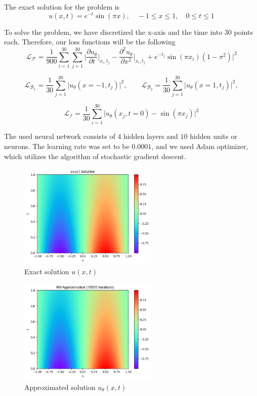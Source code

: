 \documentclass[a4paper,12pt]{article}
\theoremstyle{definition}
\begin{document}
The exact solution for the problem is 
\begin{equation}
u(x, t) = e^{-t} \sin(\pi x), \quad -1 \le x \le 1, \quad 0 \le t \le 1
\end{equation}

To solve the problem, we have discretized the x-axis and the time into $30$ points each.
Therefore, our loss functions will be the following
$$
\mathcal{L}_{\mathcal{F}} = \frac{1}{900} \sum_{i=1}^{30} \sum_{j=1}^{30} 
\Bigg| 
\frac{\partial u_\theta}{\partial t}\bigg|_{x_i, t_j} - \frac{\partial^2 u_\theta}{\partial x^2}\bigg|_{x_i, t_j}
+ e^{-t_j} \sin{(\pi x_i)} (1 - \pi^2) 
\Bigg|^2
$$

$$
\mathcal{L}_{\mathcal{B}_1} = \frac{1}{30} \sum_{j=1}^{30} 
\Bigg| u_\theta(x=-1, t_j) \Bigg|^2, \qquad
\mathcal{L}_{\mathcal{B}_2} = \frac{1}{30} \sum_{j=1}^{30} 
\Bigg| u_\theta(x=1, t_j) \Bigg|^2,
$$

$$
\mathcal{L}_{\mathcal{I}} = \frac{1}{30} \sum_{i=1}^{30}
\Bigg| u_\theta(x_j, t=0) - \sin(\pi x_j) \Bigg|^2
$$

The used neural network consists of $4$ hidden layers and $10$ hidden units or neurons.
The learning rate was set to be $0.0001$, and we used Adam optimizer, which utilizes the 
algorithm of stochastic gradient descent. 

\begin{figure}[H]
    \centering
    \includegraphics[width=250px]{images/exact_solution_diff.png}
    \vspace{-1em}
    \caption{Exact solution $u(x,t)$}
    \label{exact diff}
\end{figure}

\begin{figure}[H]
    \centering
    \includegraphics[width=250px]{images/approx_solution_diff.png}
    \vspace{-1em}
    \caption{Approximated solution $u_\theta(x,t)$}
    \label{approximation diff}
\end{figure}
\end{document}
